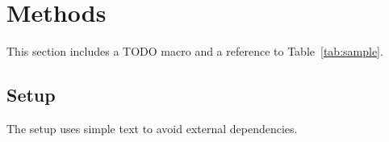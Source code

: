 \section{Methods}\label{sec:methods}
This section includes a TODO macro and a reference to Table~\ref{tab:sample}.


\subsection{Setup}
The setup uses simple text to avoid external dependencies.
